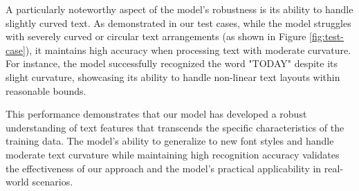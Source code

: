 A particularly noteworthy aspect of the model's robustness is its ability to handle slightly 
curved text. As demonstrated in our test cases, while the model struggles with severely 
curved or circular text arrangements (as shown in Figure \ref{fig:test-case}), it maintains 
high accuracy when processing text with moderate curvature. For instance, the model 
successfully recognized the word "TODAY" despite its slight curvature, showcasing 
its ability to handle non-linear text layouts within reasonable bounds.

This performance demonstrates that our model has developed a robust understanding of text 
features that transcends the specific characteristics of the training data. The model's 
ability to generalize to new font styles and handle moderate text curvature while 
maintaining high recognition accuracy validates the effectiveness of our approach 
and the model's practical applicability in real-world scenarios.
